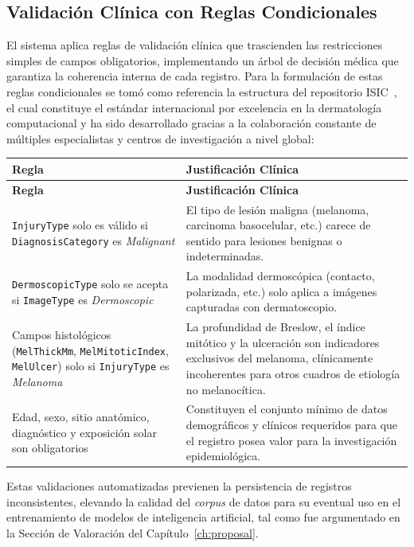 \subsection{Validación Clínica con Reglas Condicionales}\label{sec:validacion_clinica}
El sistema aplica reglas de validación clínica que trascienden las restricciones simples de campos 
obligatorios, implementando un árbol de decisión médica que garantiza la coherencia interna de cada registro. 
Para la formulación de estas reglas condicionales se tomó como referencia la estructura del repositorio 
ISIC~\cite{isic_home}, el cual constituye el estándar internacional por excelencia en la dermatología 
computacional y ha sido desarrollado gracias a la colaboración constante de múltiples especialistas y centros 
de investigación a nivel global:

\begin{longtable}{|p{7cm}|p{7.5cm}|}
\hline
\textbf{Regla} & \textbf{Justificación Clínica} \\
\hline
\endfirsthead
\hline
\textbf{Regla} & \textbf{Justificación Clínica} \\
\hline
\endhead
\texttt{InjuryType} solo es válido si \texttt{DiagnosisCategory} es \textit{Malignant} & El tipo de 
lesión maligna (melanoma, carcinoma basocelular, etc.) carece de sentido para lesiones benignas o 
indeterminadas. \\
\hline
\texttt{DermoscopicType} solo se acepta si \texttt{ImageType} es \textit{Dermoscopic} & La modalidad 
dermoscópica (contacto, polarizada, etc.) solo aplica a imágenes capturadas con dermatoscopio. \\
\hline
Campos histológicos (\texttt{MelThickMm}, \texttt{MelMitoticIndex}, \texttt{MelUlcer}) solo si 
\texttt{InjuryType} es \textit{Melanoma} & La profundidad de Breslow, el índice mitótico y la 
ulceración son indicadores exclusivos del melanoma, clínicamente incoherentes para otros cuadros 
de etiología no melanocítica. \\
\hline
Edad, sexo, sitio anatómico, diagnóstico y exposición solar son obligatorios & Constituyen el conjunto 
mínimo de datos demográficos y clínicos requeridos para que el registro posea valor para la investigación 
epidemiológica. \\
\hline
\end{longtable}

Estas validaciones automatizadas previenen la persistencia de registros inconsistentes, elevando la 
calidad del \textit{corpus} de datos para su eventual uso en el entrenamiento de modelos de inteligencia 
artificial, tal como fue argumentado en la Sección de Valoración del Capítulo~\ref{ch:proposal}.

